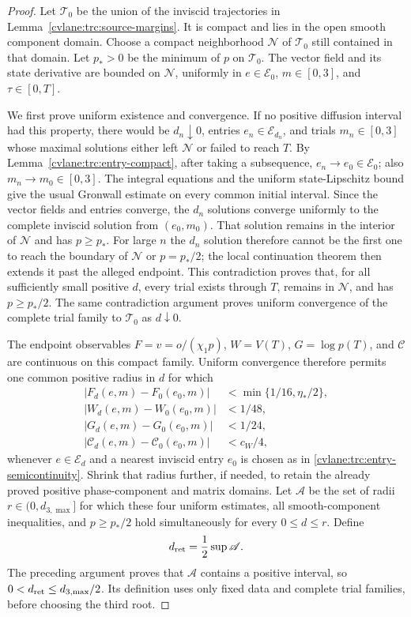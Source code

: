 \begin{proof}
Let $\mathscr T_0$ be the union of the inviscid trajectories in
Lemma~\ref{cvlane:trc:source-margins}.  It is compact and lies in the open smooth
component domain.  Choose a compact neighborhood $\mathscr N$ of
$\mathscr T_0$ still contained in that domain.  Let $p_*>0$ be the minimum
of $p$ on $\mathscr T_0$.  The vector field and its state derivative are
bounded on $\mathscr N$, uniformly in $e\in\mathcal E_0$,
$m\in[0,3]$, and $\tau\in[0,T]$.

We first prove uniform existence and convergence.  If no positive
diffusion interval had this property, there would be $d_n\downarrow0$,
entries $e_n\in\mathcal E_{d_n}$, and trials $m_n\in[0,3]$ whose maximal
solutions either left $\mathscr N$ or failed to reach $T$.  By
Lemma~\ref{cvlane:trc:entry-compact}, after taking a subsequence,
$e_n\to e_0\in\mathcal E_0$; also $m_n\to m_0\in[0,3]$.
The integral equations and the uniform state-Lipschitz bound give the
usual Gronwall estimate on every common initial interval.  Since the
vector fields and entries converge, the $d_n$ solutions converge uniformly
to the complete inviscid solution from $(e_0,m_0)$.  That solution remains
in the interior of $\mathscr N$ and has $p\geq p_*$.  For large $n$ the
$d_n$ solution therefore cannot be the first one to reach the boundary of
$\mathscr N$ or $p=p_*/2$; the local continuation theorem then extends it
past the alleged endpoint.  This contradiction proves that, for all
sufficiently small positive $d$, every trial exists through $T$, remains
in $\mathscr N$, and has $p\geq p_*/2$.  The same contradiction argument
proves uniform convergence of the complete trial family to
$\mathscr T_0$ as $d\downarrow0$.

The endpoint observables $F=v=o/(\chi_1p)$, $W=V(T)$,
$G=\log p(T)$, and $\mathcal C$ are continuous on this compact family.
Uniform convergence therefore permits one common positive radius in $d$
for which
\begin{align*}
 |F_d(e,m)-F_0(e_0,m)|&<\min\{1/16,\eta_*/2\},\\
 |W_d(e,m)-W_0(e_0,m)|&<1/48,\\
 |G_d(e,m)-G_0(e_0,m)|&<1/24,\\
 |\mathcal C_d(e,m)-\mathcal C_0(e_0,m)|&<c_W/4,
\end{align*}
whenever $e\in\mathcal E_d$ and a nearest inviscid entry $e_0$ is chosen
as in \eqref{cvlane:trc:entry-semicontinuity}.  Shrink that radius further, if
needed, to retain the already proved positive phase-component and matrix
domains.  Let $\mathscr A$ be the set of radii
$r\in(0,d_{3,\max}]$ for which these four uniform estimates, all
smooth-component inequalities, and $p\geq p_*/2$ hold simultaneously for
every $0\leq d\leq r$.  Define
\begin{equation}\label{cvlane:trc:dret-definition}
 d_{\rm ret}=\frac12\sup\mathscr A.
\end{equation}
The preceding argument proves that $\mathscr A$ contains a positive
interval, so $0<d_{\rm ret}\leq d_{3,\max}/2$.  Its definition uses only
fixed data and complete trial families, before choosing the third root.


\end{proof}
